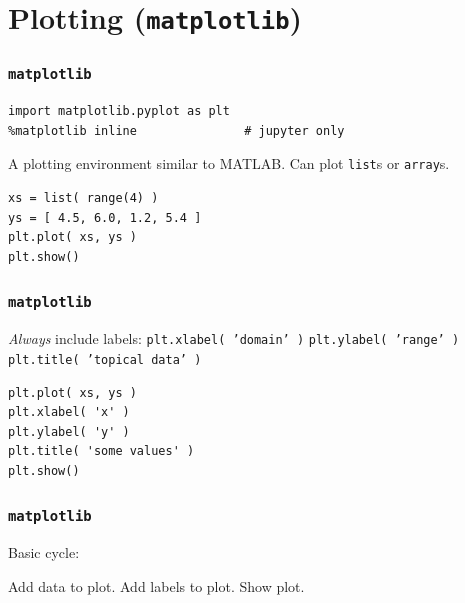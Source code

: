 \documentclass[11pt]{beamer}
\begin{document}
\section{Plotting (\texttt{matplotlib})}

\begin{frame}[fragile]
  \frametitle{\texttt{matplotlib}}
  \Enlarge

  \begin{Verbatim}
import matplotlib.pyplot as plt
%matplotlib inline               # jupyter only
  \end{Verbatim}
  \begin{enumerate}
  \myitem  A plotting environment similar to MATLAB.
  \myitem  Can plot \texttt{list}s or \texttt{array}s.
  \end{enumerate}
  \begin{Verbatim}
xs = list( range(4) )
ys = [ 4.5, 6.0, 1.2, 5.4 ]
plt.plot( xs, ys )
plt.show()
  \end{Verbatim}
\end{frame}

\begin{frame}[fragile]
  \frametitle{\texttt{matplotlib}}
  \Enlarge

  \begin{enumerate}
  \myitem  \emph{Always} include labels:
  \mysubitem  \texttt{plt.xlabel( 'domain' )}
  \mysubitem  \texttt{plt.ylabel( 'range' )}
  \mysubitem  \texttt{plt.title( 'topical data' )}
  \end{enumerate}
  \begin{Verbatim}
plt.plot( xs, ys )
plt.xlabel( 'x' )
plt.ylabel( 'y' )
plt.title( 'some values' )
plt.show()
  \end{Verbatim}
\end{frame}

\begin{frame}[fragile]
  \frametitle{\texttt{matplotlib}}
  \Enlarge

  \begin{enumerate}
  \myitem  Basic cycle:
    \begin{enumerate}
    \mysubitem  Add data to plot.
    \mysubitem  Add labels to plot.
    \mysubitem  Show plot.
    \end{enumerate}
  \end{enumerate}
\end{frame}
\end{document}
